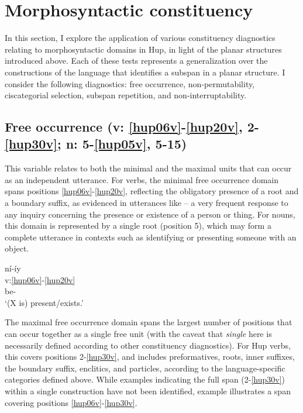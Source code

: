 \documentclass[output=paper]{langscibook}
\begin{document}
\section{Morphosyntactic constituency}
\label{sec:hup:key:4}

In this section, I explore the application of various constituency diagnostics relating to morphosyntactic domains in Hup, in light of the planar structures introduced above. Each of these tests represents a generalization over the constructions of the language that identifies a subspan in a planar structure. I consider the following diagnostics: free occurrence, non-permutability, ciscategorial selection, subspan repetition, and non-interruptability. 

\subsection{Free occurrence (v: \ref{hup06v}-\ref{hup20v}, 2-\ref{hup30v}; n: 5-\ref{hup05v}, 5-15)} 
\label{sec:hup:key:4.1}

This variable relates to both the minimal and the maximal units that can occur as an independent utterance. For verbs, the minimal free occurrence domain spans positions \ref{hup06v}-\ref{hup20v}, reflecting the obligatory presence of a root and a boundary suffix, as evidenced in utterances like  – a very frequent response to any inquiry concerning the presence or existence of a person or thing. For nouns, this domain is represented by a single root (position 5), which may form a complete utterance in contexts such as identifying or presenting someone with an object.

\ea\label{ex:hup:key:13} 
\glll ní-íy\\
v:\ref{hup06v}-\ref{hup20v} \\
be-\Dynm{}\\ 
\glt `(X is) present/exists.'
\z 

The maximal free occurrence domain spans the largest number of positions that can occur together as a single free unit (with the caveat that \textit{single} here is necessarily defined according to other constituency diagnostics). For Hup verbs, this covers positions 2-\ref{hup30v}, and includes preformatives, roots, inner suffixes, the boundary suffix, enclitics, and particles, according to the language-specific categories defined above. While examples indicating the full span (2-\ref{hup30v}) within a single construction have not been identified, example  illustrates a span covering positions \ref{hup06v}-\ref{hup30v}.
\end{document}
